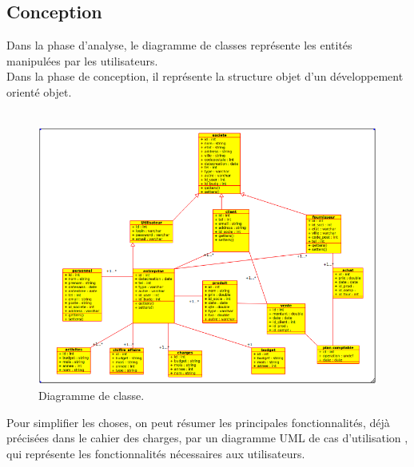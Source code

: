 \documentclass[12pt]{article}
\begin{document}
\subsection{Conception}

Dans la phase d’analyse, le diagramme de classes représente les entités  manipulées par les utilisateurs.\\
Dans la phase de conception, il représente la structure objet d’un développement orienté objet.\\
\\

\begin{center}
\begin{figure}[htp]
  \centering
  \includegraphics[width=12cm]{dc.png}
  \caption{Diagramme de classe.}
  \label{fig:une-autre-image}
\end{figure}

\end{center}



Pour simplifier les choses, on peut résumer les principales fonctionnalités, déjà précisées dans le cahier des charges, par un diagramme UML de cas d'utilisation , qui  représente les fonctionnalités  nécessaires aux utilisateurs.\\

\\
\\
\end{document}
